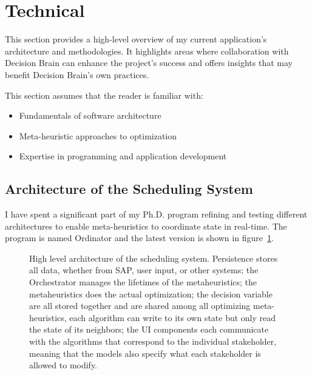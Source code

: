 \newpage
\section{Technical}
\label{sec:technical}
This section provides a high-level overview of my current application's
architecture and methodologies. It highlights areas where collaboration with
Decision Brain can enhance the project's success and offers insights that may
benefit Decision Brain's own practices. 

This section assumes that the reader is familiar with:
\begin{itemize}
	\item Fundamentals of software architecture
	\item Meta-heuristic approaches to optimization
	\item Expertise in programming and application development
\end{itemize}

\subsection*{Architecture of the Scheduling System}
I have spent a significant part of my Ph.D. program refining and testing different architectures to enable
meta-heuristics to coordinate state in real-time. The program is named Ordinator and the latest version is shown in figure~\ref{fig:ordinator:architecture}.

\begin{figure}[H]
	\centering
	

	\caption{
		High level architecture of the scheduling system. Persistence stores
		all data, whether from SAP, user input, or other systems; the Orchestrator manages the lifetimes of the 
		metaheuristics; the metaheuristics does the actual optimization;
		the decision variable are all stored together and are shared among all optimizing meta-heuristics, 
		each algorithm can write to its own state but only read the state of its neighbors; the UI components
		each communicate with the algorithms that correspond to the individual stakeholder, meaning that the 
		models also specify what each stakeholder is allowed to modify.
	}
	\label{fig:ordinator:architecture}
\end{figure}

